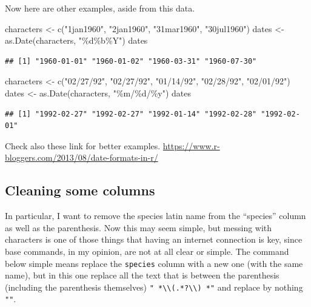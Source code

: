\documentclass[
]{book}
\newenvironment{Shaded}{\begin{snugshade}}{\end{snugshade}}
\newcommand{\FunctionTok}[1]{\textcolor[rgb]{0.00,0.00,0.00}{#1}}
\newcommand{\NormalTok}[1]{#1}
\newcommand{\OtherTok}[1]{\textcolor[rgb]{0.56,0.35,0.01}{#1}}
\newcommand{\StringTok}[1]{\textcolor[rgb]{0.31,0.60,0.02}{#1}}
\begin{document}
Now here are other examples, aside from this data.

\begin{Shaded}
\begin{Highlighting}[]
\NormalTok{characters }\OtherTok{\textless{}{-}} \FunctionTok{c}\NormalTok{(}\StringTok{"1jan1960"}\NormalTok{, }\StringTok{"2jan1960"}\NormalTok{, }\StringTok{"31mar1960"}\NormalTok{, }\StringTok{"30jul1960"}\NormalTok{)}
\NormalTok{dates }\OtherTok{\textless{}{-}} \FunctionTok{as.Date}\NormalTok{(characters, }\StringTok{"\%d\%b\%Y"}\NormalTok{)}
\NormalTok{dates}
\end{Highlighting}
\end{Shaded}

\begin{verbatim}
## [1] "1960-01-01" "1960-01-02" "1960-03-31" "1960-07-30"
\end{verbatim}

\begin{Shaded}
\begin{Highlighting}[]
\NormalTok{characters }\OtherTok{\textless{}{-}} \FunctionTok{c}\NormalTok{(}\StringTok{"02/27/92"}\NormalTok{, }\StringTok{"02/27/92"}\NormalTok{, }\StringTok{"01/14/92"}\NormalTok{, }\StringTok{"02/28/92"}\NormalTok{, }\StringTok{"02/01/92"}\NormalTok{)}
\NormalTok{dates }\OtherTok{\textless{}{-}} \FunctionTok{as.Date}\NormalTok{(characters, }\StringTok{"\%m/\%d/\%y"}\NormalTok{)}
\NormalTok{dates}
\end{Highlighting}
\end{Shaded}

\begin{verbatim}
## [1] "1992-02-27" "1992-02-27" "1992-01-14" "1992-02-28" "1992-02-01"
\end{verbatim}

Check also these link for better examples.
\url{https://www.r-bloggers.com/2013/08/date-formats-in-r/}

\hypertarget{cleaning-some-columns}{%
\subsection{Cleaning some columns}\label{cleaning-some-columns}}

In particular, I want to remove the species latin name from the ``species'' column as well as the parenthesis.
Now this may seem simple, but messing with characters is one of those things that having an internet connection is key, since base commands, in my opinion, are not at all clear or simple.
The command below simple means replace the \texttt{species} column with a new one (with the same name), but in this one replace all the text that is between the parenthesis (including the parenthesis themselves) \texttt{"\ *\textbackslash{}\textbackslash{}(.*?\textbackslash{}\textbackslash{})\ *"} and replace by nothing \texttt{""}.
\end{document}
